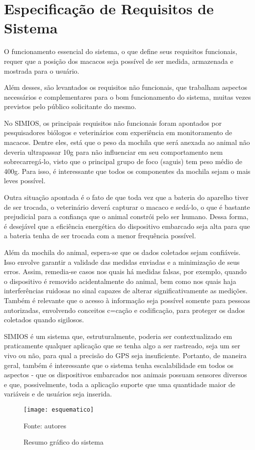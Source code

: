 \chapter{Especificação de Requisitos de Sistema}
O funcionamento essencial do sistema, o que define seus requisitos funcionais, requer que a posição dos macacos seja possível de ser medida, armazenada e mostrada para o usuário.

Além desses, são levantados os requisitos não funcionais, que trabalham aspectos necessários e complementares para o bom funcionamento do sistema, muitas vezes previstos pelo público solicitante do mesmo.

No SIMIOS, os principais requisitos não funcionais foram apontados por pesquisadores biólogos e veterinários com experiência em monitoramento de macacos. Dentre eles, está que o peso da mochila que será anexada ao animal não deveria ultrapassar 10g para não influenciar em seu comportamento nem sobrecarregá-lo, visto que o principal grupo de foco (saguis) tem peso médio de 400g. Para isso, é interessante que todos os componentes da mochila sejam o mais leves possível.

Outra situação apontada é o fato de que toda vez que a bateria do aparelho tiver de ser trocada, o veterinário deverá capturar o macaco e sedá-lo, o que é bastante prejudicial para a confiança que o animal constrói pelo ser humano. Dessa forma, é desejável que a eficiência energética do dispositivo embarcado seja alta para que a bateria tenha de ser trocada com a menor frequência possível.

Além da mochila do animal, espera-se que os dados coletados sejam confiáveis. Isso envolve garantir a validade das medidas enviadas e a minimização de seus erros. Assim, remedia-se casos nos quais há medidas falsas, por exemplo, quando o dispositivo é removido acidentalmente do animal, bem como nos quais haja interferências ruidosas no sinal capazes de alterar significativamente as medições. Também é relevante que o acesso à informação seja possível somente para pessoas autorizadas, envolvendo conceitos c=cação e codificação, para proteger os dados coletados quando sigilosos.

SIMIOS é um sistema que, estruturalmente, poderia ser contextualizado em praticamente qualquer aplicação que se tenha algo a ser rastreado, seja um ser vivo ou não, para qual a precisão do GPS seja insuficiente. Portanto, de maneira geral, também é interessante que o sistema tenha escalabilidade em todos os aspectos - que os dispositivos embarcados nos animais possuam sensores diversos e que, possivelmente, toda a aplicação suporte que uma quantidade maior de variáveis e de usuários seja inserida.

\begin{figure}[ht]
  \centering
  \caption{Resumo gráfico do sistema}
    \texttt{[image: esquematico]}
  \centerline{\small{Fonte: autores}}
\end{figure}
\FloatBarrier
